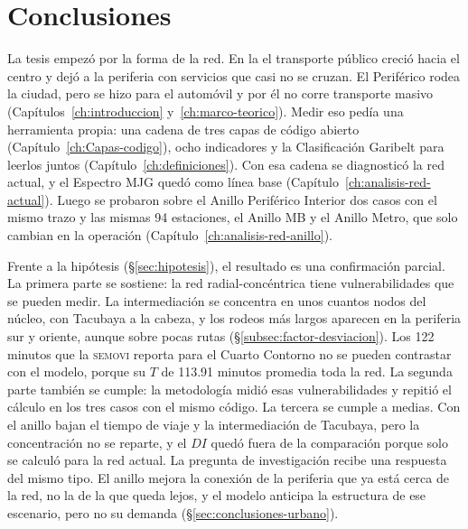 %
%
\chapter{Conclusiones}
\label{ch:conclusiones}

La tesis empezó por la forma de la red. En la \zmvm{} el transporte público
creció hacia el centro y dejó a la periferia con servicios que casi no se
cruzan. El Periférico rodea la ciudad, pero se hizo para el automóvil y por él
no corre transporte masivo (Capítulos~\ref{ch:introduccion}
y~\ref{ch:marco-teorico}). Medir eso pedía una herramienta propia: una cadena
de tres capas de código abierto (Capítulo~\ref{ch:Capas-codigo}), ocho
indicadores y la Clasificación Garibelt para leerlos juntos
(Capítulo~\ref{ch:definiciones}). Con esa cadena se diagnosticó la red actual,
y el Espectro MJG quedó como línea base (Capítulo~\ref{ch:analisis-red-actual}).
Luego se probaron sobre el Anillo Periférico Interior dos casos con el mismo
trazo y las mismas 94 estaciones, el Anillo MB y el Anillo Metro, que solo
cambian en la operación (Capítulo~\ref{ch:analisis-red-anillo}).

Frente a la hipótesis (§\ref{sec:hipotesis}), el resultado es una
confirmación parcial. La primera parte se sostiene: la red radial-concéntrica
tiene vulnerabilidades que se pueden medir. La intermediación se concentra en
unos cuantos nodos del núcleo, con Tacubaya a la cabeza, y los rodeos más
largos aparecen en la periferia sur y oriente, aunque sobre pocas rutas
(§\ref{subsec:factor-desviacion}). Los 122 minutos que la \textsc{semovi}
reporta para el Cuarto Contorno \citep{semovi2020diagnostico} no se pueden
contrastar con el modelo, porque su $T$ de 113.91 minutos promedia toda la red.
La segunda parte también se cumple: la metodología midió esas vulnerabilidades
y repitió el cálculo en los tres casos con el mismo código. La tercera se
cumple a medias. Con el anillo bajan el tiempo de viaje y la intermediación de
Tacubaya, pero la concentración no se reparte, y el $DI$ quedó fuera de la
comparación porque solo se calculó para la red actual. La pregunta de
investigación recibe una respuesta del mismo tipo. El anillo mejora la conexión
de la periferia que ya está cerca de la red, no la de la que queda lejos, y el
modelo anticipa la estructura de ese escenario, pero no su demanda
(§\ref{sec:conclusiones-urbano}).

